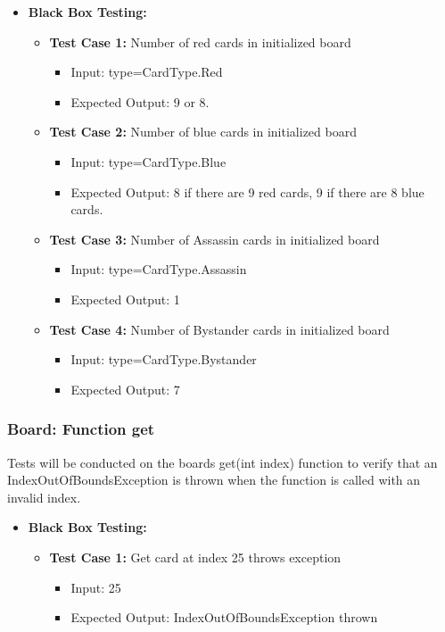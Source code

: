\documentclass[12pt]{article}
\begin{document}
\begin{itemize}
    \item \textbf{Black Box Testing:}
    \begin{itemize}
        \item \textbf{Test Case 1:} Number of red cards in initialized board
            \begin{itemize}
            \item Input: type=CardType.Red
            \item Expected Output: 9 or 8.
        \end{itemize}
        \item \textbf{Test Case 2:} Number of blue cards in initialized board
            \begin{itemize}
            \item Input: type=CardType.Blue
            \item Expected Output: 8 if there are 9 red cards, 9 if there are 8 blue cards.
        \end{itemize}
         \item \textbf{Test Case 3:} Number of Assassin cards in initialized board
            \begin{itemize}
            \item Input: type=CardType.Assassin
            \item Expected Output: 1
        \end{itemize}
        \item \textbf{Test Case 4:} Number of Bystander cards in initialized board
            \begin{itemize}
            \item Input: type=CardType.Bystander
            \item Expected Output: 7
        \end{itemize}
    \end{itemize}
\end{itemize}

\subsubsection{Board: Function get}
Tests will be conducted on the boards get(int index) function to verify that an IndexOutOfBoundsException is thrown when the function is called with an invalid index.
\begin{itemize}
    \item \textbf{Black Box Testing:}
    \begin{itemize}
        \item \textbf{Test Case 1:} Get card at index 25 throws exception
            \begin{itemize}
            \item Input: 25
            \item Expected Output: IndexOutOfBoundsException thrown
        \end{itemize}
    \end{itemize}
\end{itemize}
\end{document}
